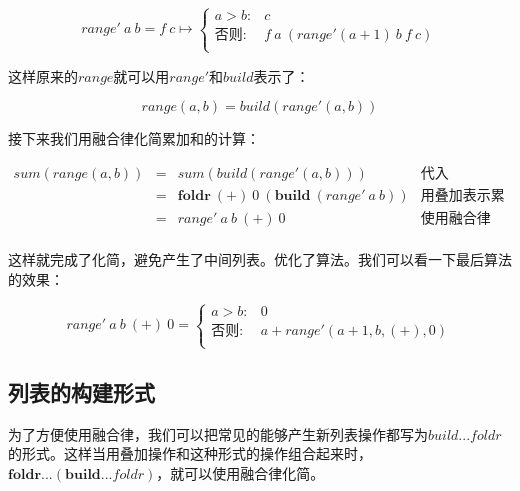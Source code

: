 \documentclass[b5paper]{ctexart}
\begin{document}
\[
range'\ a\ b = f\ c \mapsto
  \begin{cases}
  a > b: & c \\
  \text{否则}: & f\ a\ (range' (a+1)\ b\ f\ c) \\
  \end{cases}
\]

这样原来的$range$就可以用$range'$和$build$表示了：

\[
range(a, b) = build(range'(a, b))
\]

接下来我们用融合律化简累加和的计算：

\[
\begin{array}{rcll}
sum(range(a, b)) & = & sum(build(range'(a, b))) & \text{代入} \\
  & = & \pmb{foldr}\ (+)\ 0\ (\pmb{build}\ (range'\ a\ b)) & \text{用叠加表示累加} \\
  & = & range'\ a\ b\ (+)\ 0 & \text{使用融合律} \\
\end{array}
\]

这样就完成了化简，避免产生了中间列表。优化了算法。我们可以看一下最后算法的效果：

\[
range'\ a\ b\ (+)\ 0 =
  \begin{cases}
  a > b: & 0 \\
  \text{否则}: & a + range'(a+1, b, (+), 0) \\
  \end{cases}
\]

\subsection{列表的构建形式}

为了方便使用融合律，我们可以把常见的能够产生新列表操作都写为$build...foldr$的形式。这样当用叠加操作和这种形式的操作组合起来时，$\pmb{foldr}...(\pmb{build}...foldr)$，就可以使用融合律化简。
\end{document}
